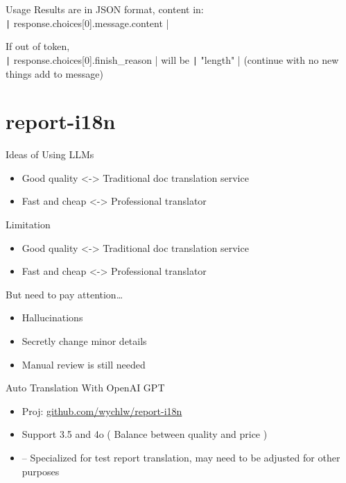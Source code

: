 \documentclass{beamer}
\begin{document}
\begin{frame}[fragile]{Usage}
    Results are in JSON format, content in: \\
    \texttt| response.choices[0].message.content |

    If out of token, \\
    \texttt| response.choices[0].finish_reason |
    will be \texttt| "length" |
    (continue with no new things add to message)
\end{frame}

\section{report-i18n}

\begin{frame}{Ideas of Using LLMs}
    \begin{itemize}
        \item Good quality <-> Traditional doc translation service
        \item Fast and cheap <-> Professional translator
    \end{itemize}
    \bigskip
    \bigskip
    \bigskip
    \bigskip
    \bigskip
\end{frame}

\begin{frame}{Limitation}
    \begin{itemize}
        \item Good quality <-> Traditional doc translation service
        \item Fast and cheap <-> Professional translator
    \end{itemize}
    \bigskip
    But need to pay attention\dots
    \begin{itemize}
        \item Hallucinations
        \item Secretly change minor details
        \item Manual review is still needed
    \end{itemize}
\end{frame}

\begin{frame}{Auto Translation With OpenAI GPT}
    \begin{itemize}
        \item Proj: \url{github.com/wychlw/report-i18n}
        \item Support 3.5 and 4o ( Balance between quality and price )
        \item -- Specialized for test report translation, may need to be adjusted for other purposes
    \end{itemize}
\end{frame}
\end{document}

